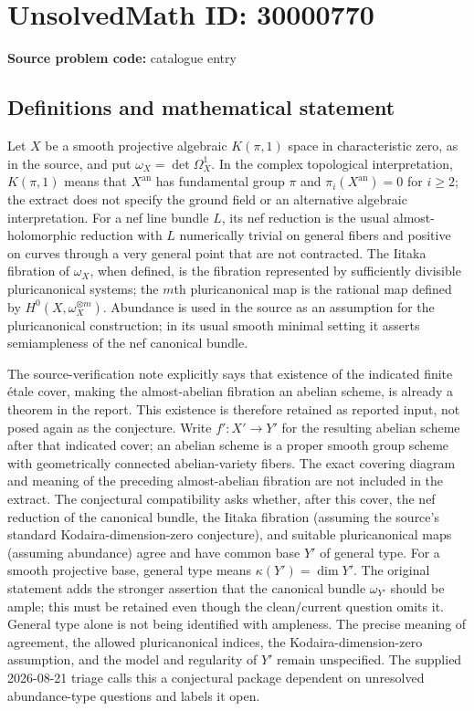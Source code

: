 \documentclass[11pt]{article}
\begin{document}
\section*{UnsolvedMath ID: 30000770}
\textbf{Source problem code:} catalogue entry
\subsection{Definitions and mathematical statement}
Let $X$ be a smooth projective algebraic $K(\pi,1)$ space in characteristic zero, as in the source, and put $\omega_X=\det\Omega_X^1$. In the complex topological interpretation, $K(\pi,1)$ means that $X^{\mathrm{an}}$ has fundamental group $\pi$ and $\pi_i(X^{\mathrm{an}})=0$ for $i\geq2$; the extract does not specify the ground field or an alternative algebraic interpretation. For a nef line bundle $L$, its nef reduction is the usual almost-holomorphic reduction with $L$ numerically trivial on general fibers and positive on curves through a very general point that are not contracted. The Iitaka fibration of $\omega_X$, when defined, is the fibration represented by sufficiently divisible pluricanonical systems; the $m$th pluricanonical map is the rational map defined by $H^0(X,\omega_X^{\otimes m})$. Abundance is used in the source as an assumption for the pluricanonical construction; in its usual smooth minimal setting it asserts semiampleness of the nef canonical bundle.\par The source-verification note explicitly says that existence of the indicated finite \'etale cover, making the almost-abelian fibration an abelian scheme, is already a theorem in the report. This existence is therefore retained as reported input, not posed again as the conjecture. Write $f':X'\to Y'$ for the resulting abelian scheme after that indicated cover; an abelian scheme is a proper smooth group scheme with geometrically connected abelian-variety fibers. The exact covering diagram and meaning of the preceding almost-abelian fibration are not included in the extract. The conjectural compatibility asks whether, after this cover, the nef reduction of the canonical bundle, the Iitaka fibration (assuming the source's standard Kodaira-dimension-zero conjecture), and suitable pluricanonical maps (assuming abundance) agree and have common base $Y'$ of general type. For a smooth projective base, general type means $\kappa(Y')=\dim Y'$. The original statement adds the stronger assertion that the canonical bundle $\omega_{Y'}$ should be ample; this must be retained even though the clean/current question omits it. General type alone is not being identified with ampleness. The precise meaning of agreement, the allowed pluricanonical indices, the Kodaira-dimension-zero assumption, and the model and regularity of $Y'$ remain unspecified. The supplied 2026-08-21 triage calls this a conjectural package dependent on unresolved abundance-type questions and labels it open.
\end{document}
